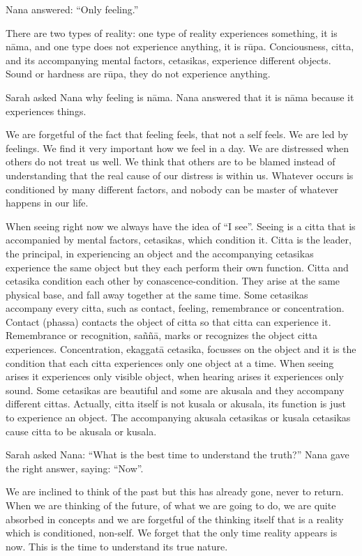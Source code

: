 Nana answered: ``Only feeling.''

There are two types of reality: one type of reality experiences
something, it is nāma, and one type does not experience anything, it is
rūpa. Conciousness, citta, and its accompanying mental factors,
cetasikas, experience different objects. Sound or hardness are rūpa,
they do not experience anything.

Sarah asked Nana why feeling is nāma. Nana answered that it is nāma
because it experiences things.

We are forgetful of the fact that feeling feels, that not a self feels.
We are led by feelings. We find it very important how we feel in a day.
We are distressed when others do not treat us well. We think that others
are to be blamed instead of understanding that the real cause of our
distress is within us. Whatever occurs is conditioned by many different
factors, and nobody can be master of whatever happens in our life.

When seeing right now we always have the idea of ``I see''. Seeing is a
citta that is accompanied by mental factors, cetasikas, which condition
it. Citta is the leader, the principal, in experiencing an object and
the accompanying cetasikas experience the same object but they each
perform their own function. Citta and cetasika condition each other by
conascence-condition. They arise at the same physical base, and fall
away together at the same time. Some cetasikas accompany every citta,
such as contact, feeling, remembrance or concentration. Contact (phassa)
contacts the object of citta so that citta can experience it.
Remembrance or recognition, saññā, marks or recognizes the object citta
experiences. Concentration, ekaggatā cetasika, focusses on the object
and it is the condition that each citta experiences only one object at a
time. When seeing arises it experiences only visible object, when
hearing arises it experiences only sound. Some cetasikas are beautiful
and some are akusala and they accompany different cittas. Actually,
citta itself is not kusala or akusala, its function is just to
experience an object. The accompanying akusala cetasikas or kusala
cetasikas cause citta to be akusala or kusala.

Sarah asked Nana: ``What is the best time to understand the truth?''
Nana gave the right answer, saying: ``Now''.

We are inclined to think of the past but this has already gone, never to
return. When we are thinking of the future, of what we are going to do,
we are quite absorbed in concepts and we are forgetful of the thinking
itself that is a reality which is conditioned, non-self. We forget that
the only time reality appears is now. This is the time to understand its
true nature.

